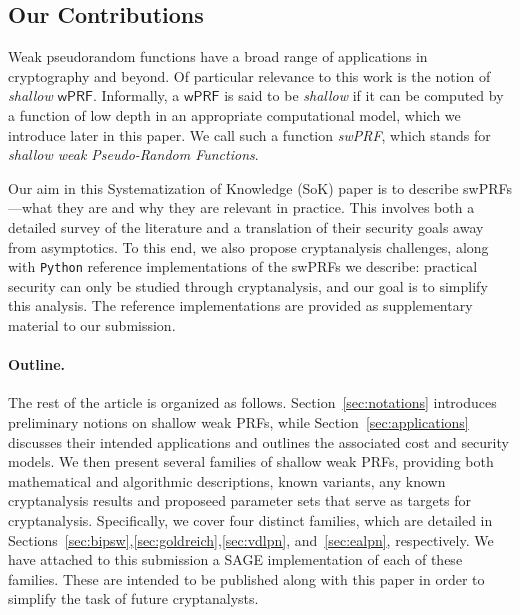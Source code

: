 \documentclass[journal=tosc,submission]{iacrtrans}
\theoremstyle{theorem}
\newcommand\wPRF{\ensuremath{\mathsf{wPRF}}\xspace}
\begin{document}
\subsection{Our Contributions}

Weak pseudorandom functions have a broad range of applications in cryptography and beyond. Of particular relevance to this work is the notion of \emph{shallow} \wPRF. Informally, a \wPRF is said to be \emph{shallow} if it can be computed by a function of low depth in an appropriate computational model, which we introduce later in this paper. We call such a function \emph{swPRF}, which stands for \emph{shallow weak Pseudo-Random Functions}.

Our aim in this Systematization of Knowledge (SoK) paper is to describe swPRFs—what they are and why they are relevant in practice. This involves both a detailed survey of the literature and a translation of their security goals away from asymptotics. To this end, we also propose cryptanalysis challenges, along with \texttt{Python} reference implementations of the swPRFs we describe: practical security can only be studied through cryptanalysis, and our goal is to simplify this analysis. The reference implementations are provided as supplementary material to our submission.

\paragraph{Outline.} The rest of the article is organized as follows. Section~\ref{sec:notations} introduces preliminary notions on shallow weak PRFs, while Section~\ref{sec:applications} discusses their intended applications and outlines the associated cost and security models. We then present several families of shallow weak PRFs, providing both mathematical and algorithmic descriptions, known variants, any known cryptanalysis results and proposeed parameter sets that serve as targets for cryptanalysis. Specifically, we cover four distinct families, which are detailed in Sections~\ref{sec:bipsw},\ref{sec:goldreich},\ref{sec:vdlpn}, and~\ref{sec:ealpn}, respectively. We have attached to this submission a \textsf{SAGE} implementation of each of these families. These are intended to be published along with this paper in order to simplify the task of future cryptanalysts.
\end{document}
